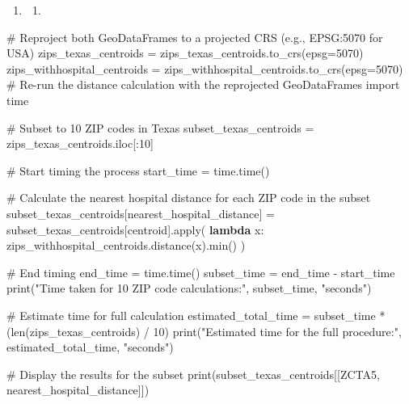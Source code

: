 \documentclass[
  letterpaper,
  DIV=11,
  numbers=noendperiod]{scrartcl}
\newenvironment{Shaded}{\begin{snugshade}}{\end{snugshade}}
\newcommand{\BuiltInTok}[1]{\textcolor[rgb]{0.00,0.23,0.31}{#1}}
\newcommand{\CommentTok}[1]{\textcolor[rgb]{0.37,0.37,0.37}{#1}}
\newcommand{\DecValTok}[1]{\textcolor[rgb]{0.68,0.00,0.00}{#1}}
\newcommand{\ImportTok}[1]{\textcolor[rgb]{0.00,0.46,0.62}{#1}}
\newcommand{\KeywordTok}[1]{\textcolor[rgb]{0.00,0.23,0.31}{\textbf{#1}}}
\newcommand{\NormalTok}[1]{\textcolor[rgb]{0.00,0.23,0.31}{#1}}
\newcommand{\OperatorTok}[1]{\textcolor[rgb]{0.37,0.37,0.37}{#1}}
\newcommand{\StringTok}[1]{\textcolor[rgb]{0.13,0.47,0.30}{#1}}
\providecommand{\tightlist}{%
  \setlength{\itemsep}{0pt}\setlength{\parskip}{0pt}}\usepackage{longtable,booktabs,array}
\begin{document}
\begin{enumerate}
\def\labelenumi{\arabic{enumi}.}
\setcounter{enumi}{3}
\tightlist
\item
  \begin{enumerate}
  \def\labelenumii{\alph{enumii}.}
  \tightlist
  \item
  \end{enumerate}
\end{enumerate}

\begin{Shaded}
\begin{Highlighting}[]
\CommentTok{\# Reproject both GeoDataFrames to a projected CRS (e.g., EPSG:5070 for USA)}
\NormalTok{zips\_texas\_centroids }\OperatorTok{=}\NormalTok{ zips\_texas\_centroids.to\_crs(epsg}\OperatorTok{=}\DecValTok{5070}\NormalTok{)}
\NormalTok{zips\_withhospital\_centroids }\OperatorTok{=}\NormalTok{ zips\_withhospital\_centroids.to\_crs(epsg}\OperatorTok{=}\DecValTok{5070}\NormalTok{)}
\CommentTok{\# Re{-}run the distance calculation with the reprojected GeoDataFrames}
\ImportTok{import}\NormalTok{ time}

\CommentTok{\# Subset to 10 ZIP codes in Texas}
\NormalTok{subset\_texas\_centroids }\OperatorTok{=}\NormalTok{ zips\_texas\_centroids.iloc[:}\DecValTok{10}\NormalTok{]}

\CommentTok{\# Start timing the process}
\NormalTok{start\_time }\OperatorTok{=}\NormalTok{ time.time()}

\CommentTok{\# Calculate the nearest hospital distance for each ZIP code in the subset}
\NormalTok{subset\_texas\_centroids[}\StringTok{\textquotesingle{}nearest\_hospital\_distance\textquotesingle{}}\NormalTok{] }\OperatorTok{=}\NormalTok{ subset\_texas\_centroids[}\StringTok{\textquotesingle{}centroid\textquotesingle{}}\NormalTok{].}\BuiltInTok{apply}\NormalTok{(}
    \KeywordTok{lambda}\NormalTok{ x: zips\_withhospital\_centroids.distance(x).}\BuiltInTok{min}\NormalTok{()}
\NormalTok{)}

\CommentTok{\# End timing}
\NormalTok{end\_time }\OperatorTok{=}\NormalTok{ time.time()}
\NormalTok{subset\_time }\OperatorTok{=}\NormalTok{ end\_time }\OperatorTok{{-}}\NormalTok{ start\_time}
\BuiltInTok{print}\NormalTok{(}\StringTok{"Time taken for 10 ZIP code calculations:"}\NormalTok{, subset\_time, }\StringTok{"seconds"}\NormalTok{)}

\CommentTok{\# Estimate time for full calculation}
\NormalTok{estimated\_total\_time }\OperatorTok{=}\NormalTok{ subset\_time }\OperatorTok{*}\NormalTok{ (}\BuiltInTok{len}\NormalTok{(zips\_texas\_centroids) }\OperatorTok{/} \DecValTok{10}\NormalTok{)}
\BuiltInTok{print}\NormalTok{(}\StringTok{"Estimated time for the full procedure:"}\NormalTok{, estimated\_total\_time, }\StringTok{"seconds"}\NormalTok{)}

\CommentTok{\# Display the results for the subset}
\BuiltInTok{print}\NormalTok{(subset\_texas\_centroids[[}\StringTok{\textquotesingle{}ZCTA5\textquotesingle{}}\NormalTok{, }\StringTok{\textquotesingle{}nearest\_hospital\_distance\textquotesingle{}}\NormalTok{]])}
\end{Highlighting}
\end{Shaded}
\end{document}
